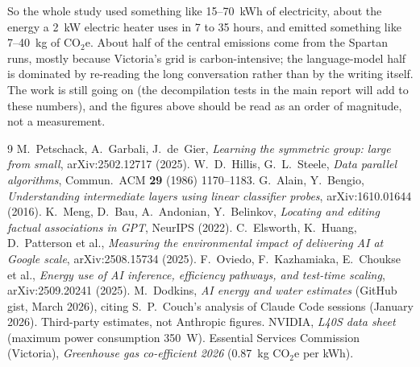 \documentclass[11pt,a4paper]{article}
\begin{document}
So the whole study used something like 15--70~kWh of electricity, about the energy a 2~kW electric heater uses in 7 to 35 hours, and emitted something like 7--40~kg of CO$_2$e. About half of the central emissions come from the Spartan runs, mostly because Victoria's grid is carbon-intensive; the language-model half is dominated by re-reading the long conversation rather than by the writing itself. The work is still going on (the decompilation tests in the main report will add to these numbers), and the figures above should be read as an order of magnitude, not a measurement.

\begin{thebibliography}{9}
 M.~Petschack, A.~Garbali, J.~de~Gier, \emph{Learning the symmetric group: large from small}, arXiv:2502.12717 (2025).
 W.~D.~Hillis, G.~L.~Steele, \emph{Data parallel algorithms}, Commun.\ ACM \textbf{29} (1986) 1170--1183.
 G.~Alain, Y.~Bengio, \emph{Understanding intermediate layers using linear classifier probes}, arXiv:1610.01644 (2016).
 K.~Meng, D.~Bau, A.~Andonian, Y.~Belinkov, \emph{Locating and editing factual associations in GPT}, NeurIPS (2022).
 C.~Elsworth, K.~Huang, D.~Patterson et al., \emph{Measuring the environmental impact of delivering AI at Google scale}, arXiv:2508.15734 (2025).
 F.~Oviedo, F.~Kazhamiaka, E.~Choukse et al., \emph{Energy use of AI inference, efficiency pathways, and test-time scaling}, arXiv:2509.20241 (2025).
 M.~Dodkins, \emph{AI energy and water estimates} (GitHub gist, March 2026), citing S.~P.~Couch's analysis of Claude Code sessions (January 2026). Third-party estimates, not Anthropic figures.
 NVIDIA, \emph{L40S data sheet} (maximum power consumption 350~W).
 Essential Services Commission (Victoria), \emph{Greenhouse gas co-efficient 2026} (0.87~kg CO$_2$e per kWh).
\end{thebibliography}
\end{document}
